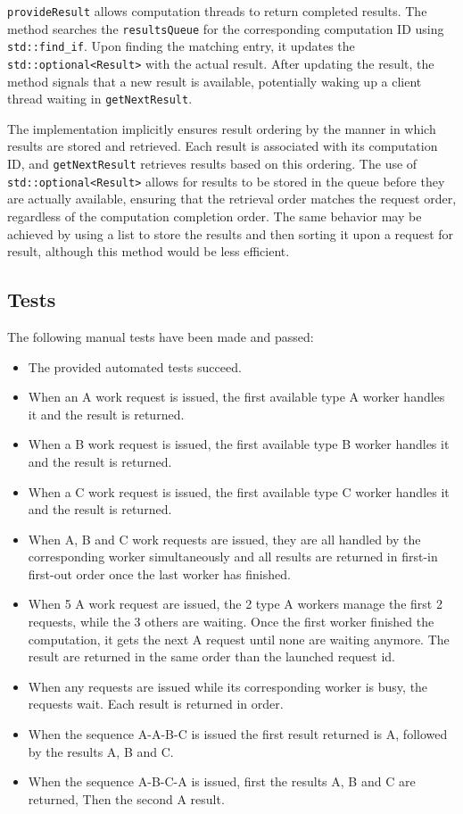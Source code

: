 \documentclass{article}
\begin{document}
    \texttt{provideResult} allows computation threads to return completed results.
    The method searches the \texttt{resultsQueue} for the corresponding computation ID using \texttt{std::find\_if}.
    Upon finding the matching entry, it updates the \texttt{std::optional<Result>} with the actual result.
    After updating the result, the method signals that a new result is available, potentially waking up a client thread waiting in \texttt{getNextResult}.

    The implementation implicitly ensures result ordering by the manner in which results are stored and retrieved.
    Each result is associated with its computation ID, and \texttt{getNextResult} retrieves results based on this ordering.
    The use of \texttt{std::optional<Result>} allows for results to be stored in the queue before they are actually available, ensuring that the retrieval order matches the request order, regardless of the computation completion order.
    The same behavior may be achieved by using a list to store the results and then sorting it upon a request for result, although this method would be less efficient.

    \subsection*{Tests}

    The following manual tests have been made and passed:
    \begin{itemize}
        \item The provided automated tests succeed.
        \item When an A work request is issued, the first available type A worker handles it and the result is returned.
        \item When a B work request is issued, the first available type B worker handles it and the result is returned.
        \item When a C work request is issued, the first available type C worker handles it and the result is returned.
        \item When A, B and C work requests are issued, they are all handled by the corresponding worker simultaneously and all results are returned in first-in first-out order once the last worker has finished.
        \item When 5 A work request are issued, the 2 type A workers manage the first 2 requests, while the 3 others are waiting. Once the first worker finished the computation, it gets the next A request until none are waiting anymore. The result are returned in the same order than the launched request id.
        \item When any requests are issued while its corresponding worker is busy, the requests wait. Each result is returned in order.
        \item When the sequence A-A-B-C is issued the first result returned is A, followed by the results A, B and C.
        \item When the sequence A-B-C-A is issued, first the results A, B and C are returned, Then the second A result.
    \end{itemize}
\end{document}
